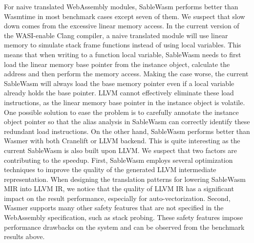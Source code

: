 For naive translated WebAssembly modules, SableWasm performs better than Wasmtime in most benchmark cases except seven of them. We suspect that slow down comes from the excessive linear memory access. In the current version of the WASI-enable Clang compiler, a naive translated module will use linear memory to simulate stack frame functions instead of using local variables. This means that when writing to a function local variable, SableWasm needs to first load the linear memory base pointer from the instance object, calculate the address and then perform the memory access. Making the case worse, the current SableWasm will always load the base memory pointer even if a local variable already holds the base pointer. LLVM cannot effectively eliminate these load instructions, as the linear memory base pointer in the instance object is volatile. One possible solution to ease the problem is to carefully annotate the instance object pointer so that the alias analysis in SableWasm can correctly identify these redundant load instructions. On the other hand, SableWasm performs better than Wasmer with both Cranelift or LLVM backend. This is quite interesting as the current SableWasm is also built upon LLVM. We suspect that two factors are contributing to the speedup. First, SableWasm employs several optimization techniques to improve the quality of the generated LLVM intermediate representation. When designing the translation patterns for lowering SableWasm MIR into LLVM IR, we notice that the quality of LLVM IR has a significant impact on the result performance, especially for auto-vectorization. Second, Wasmer supports many other safety features that are not specified in the WebAssembly specification, such as stack probing. These safety features impose performance drawbacks on the system and can be observed from the benchmark results above.

